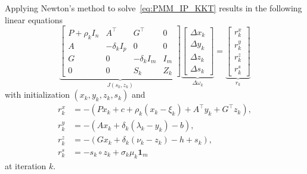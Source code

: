 \documentclass[letterpaper, 10 pt, conference]{ieeeconf}  \IEEEoverridecommandlockouts
\begin{document}
Applying Newton's method to solve~\eqref{eq:PMM_IP_KKT} results in the following linear equations 
\begin{equation} \label{eq:affine}
\underbrace{\begin{bmatrix}    
P + \rho_k I_n & A^\top & G^\top & 0 \\[0.12cm]
A & -\delta_k I_p & 0 & 0 \\[0.12cm]
G & 0 & -\delta_k I_m & I_m \\[0.12cm]
0 & 0 & S_k & Z_k
\end{bmatrix}}_{J(s_k,z_k)}
\underbrace{
\begin{bmatrix}
\Delta x_k \\[0.12cm]
\Delta y_k \\[0.12cm]
\Delta z_k \\[0.12cm]
\Delta s_k
\end{bmatrix}}_{\Delta \omega_k}
=
\underbrace{\begin{bmatrix}
r^x_k \\[0.12cm]
r^y_k \\[0.12cm]
r^z_k \\[0.12cm]
r^s_k
\end{bmatrix}}_{
r_k
}
\end{equation}
with initialization $(x_k,y_k,z_k,s_k)$ and 
\begin{equation*}
\begin{aligned}
r^x_k &= - (Px_k + c + \rho_k(x_k-\xi_k) + A^\top y_k + G^\top z_k), \\
r^y_k &= - (Ax_k + \delta_k(\lambda_k-y_k) - b), \\
r^z_k &= - (Gx_k + \delta_k(\nu_k - z_k) - h + s_k), \\
r^s_k &= -s_k \circ z_k + \sigma_k \mu_k\mathbf{1}_m
\end{aligned}
\end{equation*}
 at iteration $k$.
\end{document}
